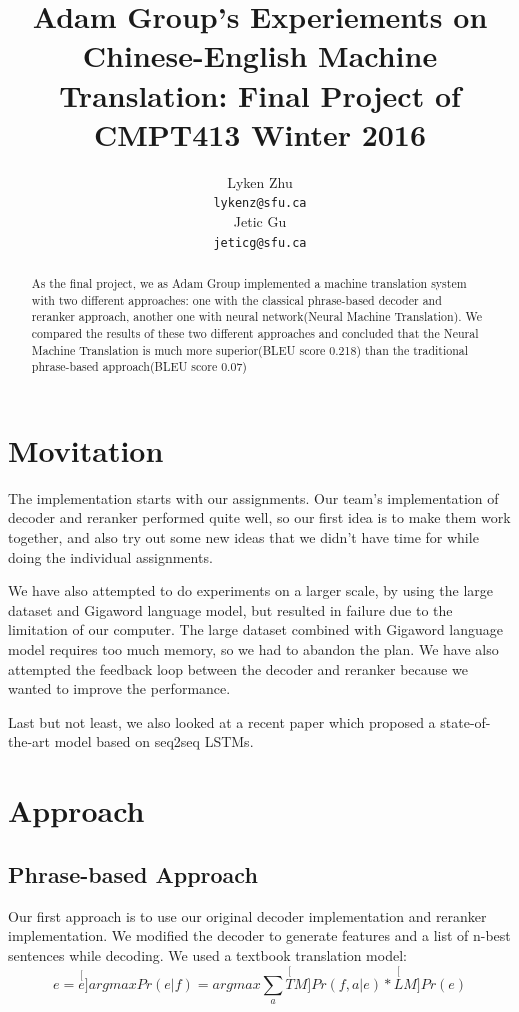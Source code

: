 \documentclass[11pt,letterpaper]{article}
\title{Adam Group's Experiements on Chinese-English Machine Translation: Final Project of CMPT413 Winter 2016}
\author{Lyken Zhu \\
  {\tt lykenz@sfu.ca} \\\And
  Jetic Gu \\
  {\tt jeticg@sfu.ca} \\}
\date{}
\begin{document}
\maketitle
\begin{abstract}
  As the final project, we as Adam Group implemented a machine translation system with two different approaches: one with the classical phrase-based decoder and reranker approach, another one with neural network(Neural Machine Translation).  We compared the results of these two different approaches and 
concluded that the Neural Machine Translation is much more superior(BLEU score 0.218) than the traditional phrase-based approach(BLEU score 0.07)
\end{abstract}

\section{Movitation}

The implementation starts with our assignments. Our team’s implementation of decoder and reranker performed quite well, so our first idea is to make them work together, and also try out some new ideas that we didn’t have time for while doing the individual assignments.

We have also attempted to do experiments on a larger scale, by using the large dataset and Gigaword language model, but resulted in failure due to the limitation of our computer. The large dataset combined with Gigaword language model requires too much memory, so we had to abandon the plan. We have also attempted the feedback loop between the decoder and reranker because we wanted to improve the performance.

Last but not least, we also looked at a recent paper \cite{seq2seq} which proposed a state-of-the-art model based on seq2seq LSTMs.

\section{Approach}

\subsection{Phrase-based Approach}
Our first approach is to use our original decoder implementation and reranker implementation. We modified the decoder to generate features and a list of n-best sentences while decoding. We used a textbook translation model:
$$e = \stackrel[e]{}{argmax} Pr(e|f) = argmax\sum_{a} \stackrel[TM]{}{Pr}(f,a|e) * \stackrel[LM]{}{Pr}(e) $$
 
\end{document}
